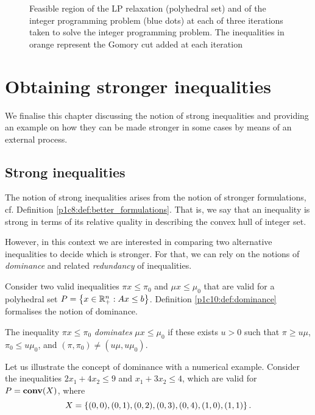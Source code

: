 \begin{figure}[h]
      \caption{Feasible region of the LP relaxation (polyhedral set) and of the integer programming problem (blue dots) at each of three iterations taken to solve the integer programming problem. The inequalities in orange represent the Gomory cut added at each iteration} \label{p1c10:fig:LP_1}	
\end{figure}


\section{Obtaining stronger inequalities}

We finalise this chapter discussing the notion of strong inequalities and providing an example on how they can be made stronger in some cases by means of an external process. 


\subsection{Strong inequalities}

The notion of strong inequalities arises from the notion of stronger formulations, cf. Definition \ref{p1c8:def:better_formulations}. That is, we say that an inequality is strong in terms of its relative quality in describing the convex hull of integer set.

However, in this context we are interested in comparing two alternative inequalities to decide which is stronger. For that, we can rely on the notions of \emph{dominance} and related \emph{redundancy} of inequalities. 

Consider two valid inequalities $\pi x \leq \pi_0$ and $\mu x \leq \mu_0$ that are valid for a polyhedral set $P = \left\{ x \in \mathbb{R}^n_+ : Ax \leq b \right \}$. Definition \ref{p1c10:def:dominance} formalises the notion of dominance.

\begin{definition}[Dominance] \label{p1c10:def:dominance}
    The inequality $\pi x \leq \pi_0$ \emph{dominates} $\mu x \leq \mu_0$ if these exists $u > 0$ such that $\pi \geq u\mu$, $\pi_0 \leq u\mu_0$, and $(\pi, \pi_0) \neq (u\mu, u\mu_0)$.
\end{definition}

Let us illustrate the concept of dominance with a numerical example. Consider the inequalities $2x_1 + 4x_2 \leq 9$ and $x_1 + 3x_2 \leq 4$, which are valid for $P = \mathop{\bf conv}(X)$, where 
	\begin{equation*}
	X = \left\{ (0,0), (0,1), (0,2), (0,3), (0,4), (1,0), (1,1) \right \}.	
	\end{equation*}
	
